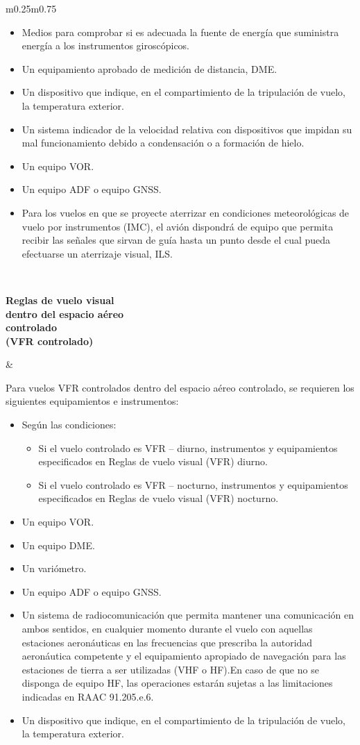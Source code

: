 \begin{longtable}{m{0.25\textwidth}m{0.75\textwidth}}
{\begin{itemize}
\item Medios para comprobar si es adecuada la fuente de energía que suministra energía a los instrumentos giroscópicos.
\item Un equipamiento aprobado de medición de distancia, \ac{DME}.
\item Un dispositivo que indique, en el compartimiento de la tripulación de vuelo, la temperatura exterior.
\item Un sistema indicador de la velocidad relativa con dispositivos que impidan su mal funcionamiento debido a condensación o a formación de hielo.
\item Un equipo \ac{VOR}.
\item Un equipo \ac{ADF} o equipo \ac{GNSS}.
\item Para los vuelos en que se proyecte aterrizar en condiciones meteorológicas de vuelo por instrumentos (IMC), el avión dispondrá de equipo que permita recibir las señales que sirvan de guía hasta un punto desde el cual pueda efectuarse un aterrizaje visual, \ac{ILS}.  

  \end{itemize}
}
\\  
\parbox{\linewidth}{\bf Reglas de vuelo visual \\dentro del espacio aéreo\\ controlado\\ (VFR controlado)}
& {\scriptsize 
 Para vuelos VFR controlados dentro del espacio aéreo controlado, se requieren los siguientes equipamientos e instrumentos:
 \begin{itemize}
 \item Seg\'un las condiciones:
   \begin{itemize}
   \item Si el vuelo controlado es VFR – diurno, instrumentos y
     equipamientos especificados en Reglas de vuelo visual (VFR)
     diurno.
   \item Si el vuelo controlado es VFR – nocturno, instrumentos y
     equipamientos especificados en Reglas de vuelo visual (VFR)
     nocturno.
   \end{itemize}
 \item Un equipo VOR.
 \item Un equipo DME.
 \item Un variómetro.
 \item Un equipo ADF o equipo GNSS.
 \item Un  sistema  de  radiocomunicación  que  permita  mantener  una  comunicación  en  ambos  sentidos,  en  cualquier momento durante el vuelo con aquellas estaciones aeronáuticas en las frecuencias que prescriba la autoridad aeronáutica  competente  y  el  equipamiento  apropiado  de  navegación  para  las  estaciones  de  tierra  a  ser  utilizadas  (VHF  o HF).En  caso  de  que  no  se  disponga  de  equipo  HF,  las  operaciones  estarán  sujetas a las  limitaciones indicadas en RAAC 91.205.e.6.
 \item Un dispositivo que indique, en el compartimiento de la tripulación de vuelo, la temperatura exterior.
 \end{itemize}


}
\end{longtable}

